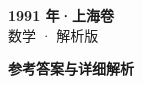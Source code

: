 \documentclass[zihao=-4, a4paper]{ctexart}
\begin{document}
\begin{center}
  {\Large\bfseries 1991 年·上海卷}\\[4pt]
  {\large 数学 · 解析版}
\end{center}
\medskip
{}

\clearpage
{}
\begin{center}{\Large\bfseries 参考答案与详细解析}\end{center}
\medskip

\end{document}

